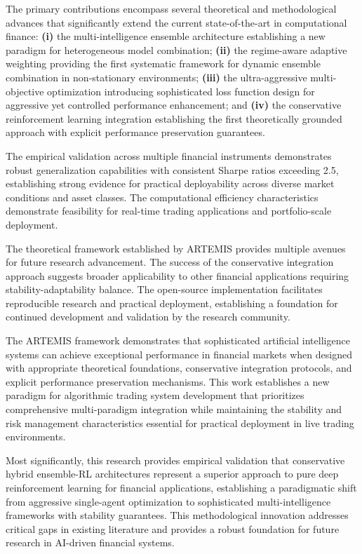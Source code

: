 \documentclass[10pt,twocolumn]{article}
\begin{document}
The primary contributions encompass several theoretical and methodological advances that significantly extend the current state-of-the-art in computational finance: \textbf{(i)} the multi-intelligence ensemble architecture establishing a new paradigm for heterogeneous model combination; \textbf{(ii)} the regime-aware adaptive weighting providing the first systematic framework for dynamic ensemble combination in non-stationary environments; \textbf{(iii)} the ultra-aggressive multi-objective optimization introducing sophisticated loss function design for aggressive yet controlled performance enhancement; and \textbf{(iv)} the conservative reinforcement learning integration establishing the first theoretically grounded approach with explicit performance preservation guarantees.

The empirical validation across multiple financial instruments demonstrates robust generalization capabilities with consistent Sharpe ratios exceeding 2.5, establishing strong evidence for practical deployability across diverse market conditions and asset classes. The computational efficiency characteristics demonstrate feasibility for real-time trading applications and portfolio-scale deployment.

The theoretical framework established by ARTEMIS provides multiple avenues for future research advancement. The success of the conservative integration approach suggests broader applicability to other financial applications requiring stability-adaptability balance. The open-source implementation facilitates reproducible research and practical deployment, establishing a foundation for continued development and validation by the research community.

The ARTEMIS framework demonstrates that sophisticated artificial intelligence systems can achieve exceptional performance in financial markets when designed with appropriate theoretical foundations, conservative integration protocols, and explicit performance preservation mechanisms. This work establishes a new paradigm for algorithmic trading system development that prioritizes comprehensive multi-paradigm integration while maintaining the stability and risk management characteristics essential for practical deployment in live trading environments.

Most significantly, this research provides empirical validation that conservative hybrid ensemble-RL architectures represent a superior approach to pure deep reinforcement learning for financial applications, establishing a paradigmatic shift from aggressive single-agent optimization to sophisticated multi-intelligence frameworks with stability guarantees. This methodological innovation addresses critical gaps in existing literature and provides a robust foundation for future research in AI-driven financial systems.
\end{document}
